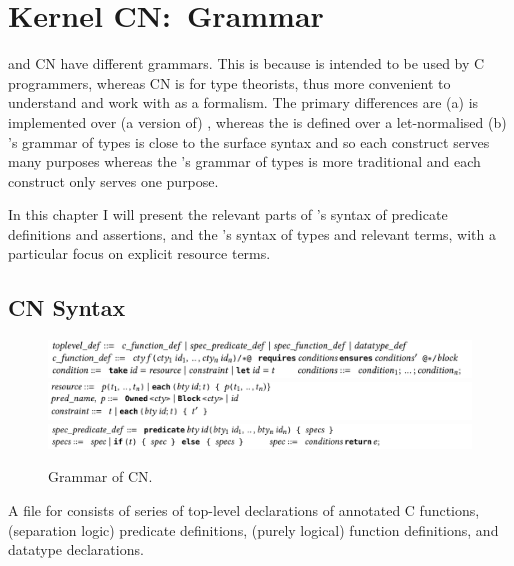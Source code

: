 \chapter{Kernel CN:\ Grammar}%
\label{chap:kernel-grammar}

\margintoc%

 and  CN have different grammars. This is because  is
intended to be used by C programmers, whereas  CN is for type
theorists, thus more convenient to understand and work with as a formalism. The
primary differences are (a)  is implemented over (a version of)
, whereas the  is defined over a let-normalised
 (b) 's grammar of types is close to the surface syntax and
so each construct serves many purposes whereas the 's grammar of types
is more traditional and each construct only serves one purpose.

In this chapter I will present the relevant parts of 's syntax of
predicate definitions and assertions, and the 's syntax of types and
relevant terms, with a particular focus on explicit resource terms.

\section{CN Syntax}%

\begin{figure}[tp]
    \centering
    \includegraphics{figures/cn-grammar-1}
    \includegraphics{figures/cn-grammar-2}
    \includegraphics{figures/cn-grammar-3}
    \caption{Grammar of CN.}\label{fig:cn-grammar}
\end{figure}

A file for  consists of series of top-level declarations of annotated C
functions, (separation logic) predicate definitions, (purely logical) function
definitions, and datatype declarations.

